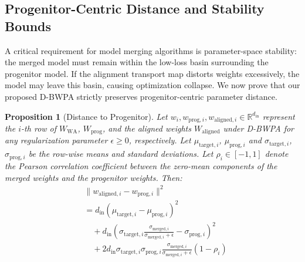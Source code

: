 \documentclass{article}
\theoremstyle{plain}
\newtheorem{proposition}[theorem]{Proposition}
\theoremstyle{definition}
\theoremstyle{remark}
\begin{document}
\subsection{Progenitor-Centric Distance and Stability Bounds}
A critical requirement for model merging algorithms is parameter-space stability: the merged model must remain within the low-loss basin surrounding the progenitor model. If the alignment transport map distorts weights excessively, the model may leave this basin, causing optimization collapse. We now prove that our proposed D-BWPA strictly preserves progenitor-centric parameter distance.

\begin{proposition}[Distance to Progenitor]
Let $w_i, w_{\mathrm{prog}, i}, w_{\mathrm{aligned}, i} \in \mathbb{R}^{d_{\mathrm{in}}}$ represent the $i$-th row of $W_{\mathrm{WA}}$, $W_{\mathrm{prog}}$, and the aligned weights $W_{\mathrm{aligned}}$ under D-BWPA for any regularization parameter $\epsilon \ge 0$, respectively. Let $\mu_{\mathrm{target}, i}$, $\mu_{\mathrm{prog}, i}$ and $\sigma_{\mathrm{target}, i}$, $\sigma_{\mathrm{prog}, i}$ be the row-wise means and standard deviations. Let $\rho_i \in [-1, 1]$ denote the Pearson correlation coefficient between the zero-mean components of the merged weights and the progenitor weights. Then:
\begin{equation}
\begin{split}
  &\|w_{\mathrm{aligned}, i} - w_{\mathrm{prog}, i}\|^2 \\
  &= d_{\mathrm{in}} (\mu_{\mathrm{target}, i} - \mu_{\mathrm{prog}, i})^2 \\
  &\quad + d_{\mathrm{in}} \left( \sigma_{\mathrm{target}, i} \frac{\sigma_{\mathrm{merged}, i}}{\sigma_{\mathrm{merged}, i} + \epsilon} - \sigma_{\mathrm{prog}, i} \right)^2 \\
  &\quad + 2 d_{\mathrm{in}} \sigma_{\mathrm{target}, i} \sigma_{\mathrm{prog}, i} \frac{\sigma_{\mathrm{merged}, i}}{\sigma_{\mathrm{merged}, i} + \epsilon} (1 - \rho_i)
\end{split}
\end{equation}
\end{proposition}
\end{document}

